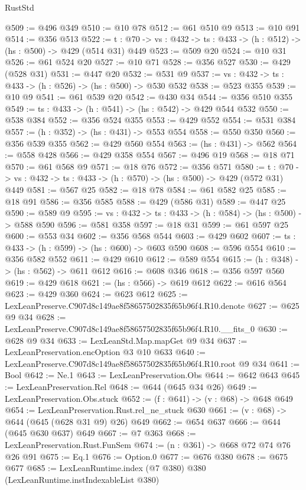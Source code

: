 \begin{lexlean}{RustStd}
\begin{coremodule}
@509 := @496 @349
@510 := @10 @78
@512 := @61 @510 @9
@513 := @10 @91
@514 := @356 @513
@522 := {t : @70} -> {vs : @432} -> {ts : @433} -> (h : @512) -> (hs : @500) -> @429 (@514 @31) @449
@523 := @509 @20
@524 := @10 @31
@526 := @61 @524 @20
@527 := @10 @71
@528 := @356 @527
@530 := @429 (@528 @31)
@531 := @447 @20
@532 := @531 @9
@537 := {vs : @432} -> {ts : @433} -> (h : @526) -> (hs : @500) -> @530 @532
@538 := @523 @355
@539 := @10 @9
@541 := @61 @539 @20
@542 := @430 @34
@544 := @356 @510 @355
@549 := {ts : @433} -> (h : @541) -> (hs : @542) -> @429 @544 @532
@550 := @538 @384
@552 := @356 @524 @355
@553 := @429 @552
@554 := @531 @384
@557 := (h : @352) -> (hs : @431) -> @553 @554
@558 := @550 @350
@560 := @356 @539 @355
@562 := @429 @560 @554
@563 := (hs : @431) -> @562
@564 := @558 @428
@566 := @429 @358 @554
@567 := @496 @19
@568 := @18 @71
@570 := @61 @568 @9
@571 := @18 @76
@572 := @356 @571
@580 := {t : @70} -> {vs : @432} -> {ts : @433} -> (h : @570) -> (hs : @500) -> @429 (@572 @31) @449
@581 := @567 @25
@582 := @18 @78
@584 := @61 @582 @25
@585 := @18 @91
@586 := @356 @585
@588 := @429 (@586 @31)
@589 := @447 @25
@590 := @589 @9
@595 := {vs : @432} -> {ts : @433} -> (h : @584) -> (hs : @500) -> @588 @590
@596 := @581 @358
@597 := @18 @31
@599 := @61 @597 @25
@600 := @553 @34
@602 := @356 @568 @544
@603 := @429 @602
@607 := {ts : @433} -> (h : @599) -> (hs : @600) -> @603 @590
@608 := @596 @554
@610 := @356 @582 @552
@611 := @429 @610
@612 := @589 @554
@615 := (h : @348) -> (hs : @562) -> @611 @612
@616 := @608 @346
@618 := @356 @597 @560
@619 := @429 @618
@621 := (hs : @566) -> @619 @612
@622 := @616 @564
@623 := @429 @360
@624 := @623 @612
@625 := LexLeanPreserve.C907d8c149ae8f58657502835f65b96f4.R10.denote
@627 := @625 @9 @34
@628 := LexLeanPreserve.C907d8c149ae8f58657502835f65b96f4.R10.__fits_0
@630 := @628 @9 @34
@633 := LexLeanStd.Map.mapGet @9 @34
@637 := LexLeanPreservation.encOption @3 @10 @633
@640 := LexLeanPreserve.C907d8c149ae8f58657502835f65b96f4.R10.root @9 @34
@641 := Bool
@642 := Ne.{1}
@643 := LexLeanPreservation.Obs
@644 := @642 @643
@645 := LexLeanPreservation.Rel
@648 := @644 (@645 @34 @26)
@649 := LexLeanPreservation.Obs.stuck
@652 := (f : @641) -> (v : @68) -> @648 @649
@654 := LexLeanPreservation.Rust.rel_ne_stuck @630
@661 := (v : @68) -> @644 (@645 (@628 @31 @9) @26) @649
@662 := @654 @637
@666 := @644 (@645 @630 @637) @649
@667 := @7 @363
@668 := LexLeanPreservation.Rust.FunSem
@674 := (n : @361) -> @668 @72 @74 @76 @26 @91
@675 := Eq.{1}
@676 := Option.{0}
@677 := @676 @380
@678 := @675 @677
@685 := LexLeanRuntime.index (@7 @380) @380 (LexLeanRuntime.instIndexableList @380)

\end{coremodule}
\end{lexlean}
